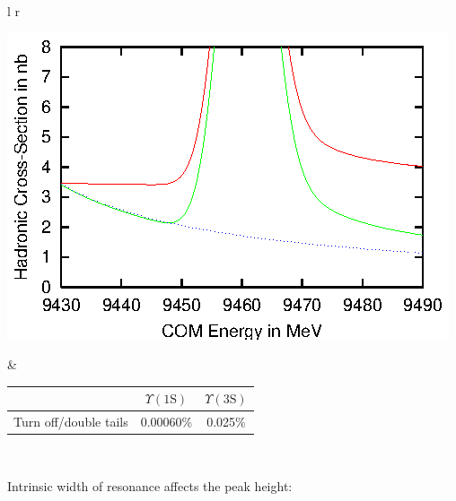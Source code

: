 \begin{slide*}
\begin{minipage}[t]{\linewidth}
\begin{center}
  \begin{tabular}{l r}
    \begin{minipage}{0.25\linewidth}
      \includegraphics[width=\linewidth]{fakedback2_lineshape.eps}
    \end{minipage} &
    \begin{minipage}{0.6\linewidth}
      \begin{center}
        \begin{tabular}{r | c | c}
          & $\Upsilon(\mbox{1S})$ & $\Upsilon(\mbox{3S})$ \\\hline
	  Turn off/double tails & 0.00060\% & 0.025\% \\
        \end{tabular}
      \end{center}
    \end{minipage} \\
  \end{tabular}
\end{center}

\vspace{1cm}
Intrinsic width of resonance affects the peak height:


\end{minipage}
\end{slide*}
